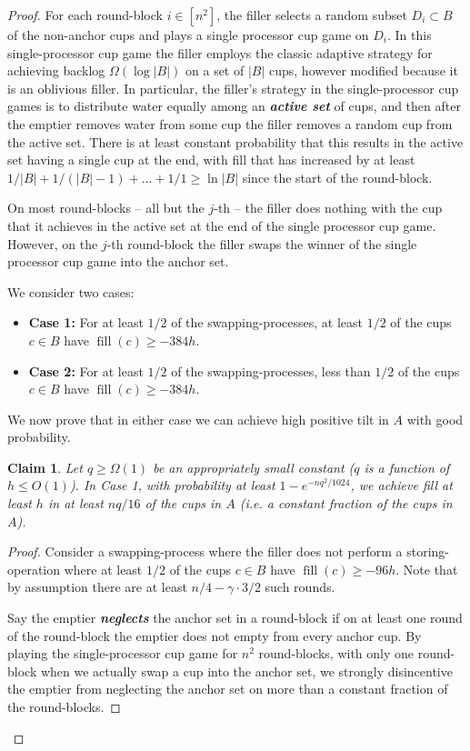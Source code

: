 \documentclass[twocolumn]{article}[10pt]
\newcommand{\defn}[1]{{\textit{\textbf{\boldmath #1}}}\xspace}
\DeclareMathOperator{\fil}{\text{fill}}
\newtheorem{clm}{Claim}
\begin{document}
\begin{proof}
For each round-block $i \in [n^2]$, the filler selects a random subset $D_i\subset
B$ of the non-anchor cups and plays a single processor cup game on $D_i$. In this
single-processor cup game the filler employs the classic adaptive strategy for
achieving backlog $\Omega(\log |B|)$ on a set of $|B|$ cups, however modified
because it is an oblivious filler. In particular, the filler's strategy in the
single-processor cup games is to distribute water equally among an \defn{active
set} of cups, and then after the emptier removes water from some cup the filler
removes a random cup from the active set. There is at least constant
probability that this results in the active set having a single cup at the end,
with fill that has increased by at least $1/|B| + 1/(|B|-1) + \ldots + 1/1 \ge
\ln |B|$ since the start of the round-block.

On most round-blocks -- all but the $j$-th -- the filler does nothing with the
cup that it achieves in the active set at the end of the single processor cup
game. However, on the $j$-th round-block the filler swaps the winner of the
single processor cup game into the anchor set.

We consider two cases:
\begin{itemize}
  \item \textbf{Case 1:} For at least $1/2$ of the swapping-processes, at
    least $1/2$ of the cups $c \in B$ have $\fil(c) \ge -384h$.
  \item \textbf{Case 2:} For at least $1/2$ of the swapping-processes, less
    than $1/2$ of the cups $c \in B$ have $\fil(c) \ge -384h$.
\end{itemize}
We now prove that in either case we can achieve high positive tilt in $A$ with
good probability.

\begin{clm} \label{clm:reg} 
  Let $q\ge \Omega(1)$ be an appropriately small constant ($q$ is a function of
  $h\le O(1)$). In Case 1, with probability at least $1-e^{-nq^2/1024}$, we
  achieve fill at least $h$ in at least $nq/16$ of the cups in $A$ (i.e. a
  constant fraction of the cups in $A$). 
\end{clm}
\begin{proof}
  Consider a swapping-process where the filler does not perform a
  storing-operation where at least $1/2$ of the cups $c \in B$ have $\fil(c)
  \ge -96h$. Note that by assumption there are at least $n/4 - \gamma\cdot 3/2$ such rounds.
 
  Say the emptier \defn{neglects} the anchor set in a round-block if on at
  least one round of the round-block the emptier does not empty from every
  anchor cup. By playing the single-processor cup game for $n^2$ round-blocks,
  with only one round-block when we actually swap a cup into the anchor set, we
  strongly disincentive the emptier from neglecting the anchor set on more
  than a constant fraction of the round-blocks. 


\end{proof}
\end{proof}
\end{document}
